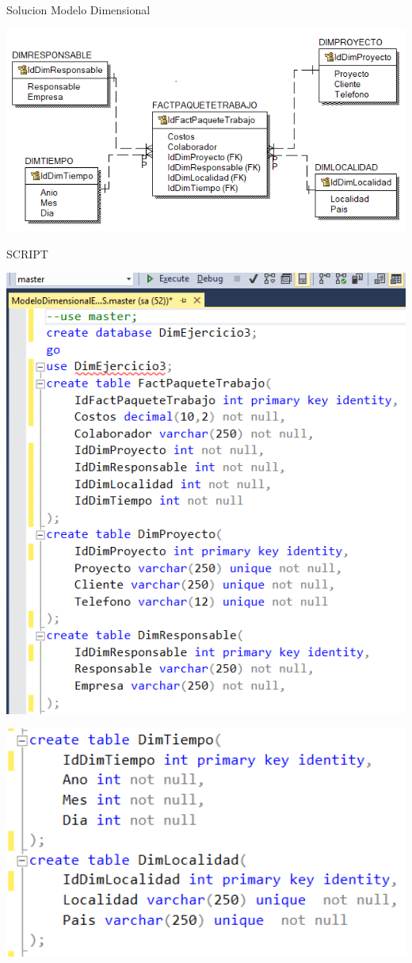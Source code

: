 \documentclass[12pt,letterpaper]{article}
\begin{document}
Solucion
Modelo Dimensional
\begin{center}
\includegraphics[width=17cm]{IMG/ejer3.png} 
\end{center}
 \newpage
SCRIPT
\begin{center}
\includegraphics[width=17cm]{IMG/sql3.png} 
\end{center}
 \newpage
\begin{center}
\includegraphics[width=17cm]{IMG/sql3-1.png} 
\end{center}
\end{document}
